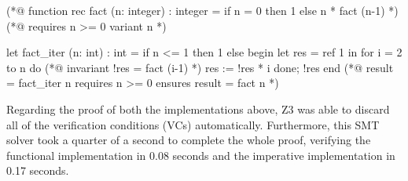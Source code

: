 \bigskip
\newcommand{\provername}[1]{\cellcolor{yellow!25}
\begin{sideways}\textbf{#1}~~\end{sideways}}
\newcommand{\explanation}[1]{\cellcolor{yellow!13}lemma \texttt{#1}}
\newcommand{\transformation}[1]{\cellcolor{yellow!13}transformation \texttt{#1}}
\newcommand{\subgoal}[2]{\cellcolor{yellow!13}subgoal #2}
\newcommand{\valid}[1]{\cellcolor{green!13}#1}
\newcommand{\unknown}[1]{\cellcolor{red!20}#1}
\newcommand{\invalid}[1]{\cellcolor{red!50}#1}
\newcommand{\timeout}[1]{\cellcolor{red!20}(#1)}
\newcommand{\outofmemory}[1]{\cellcolor{red!20}(#1)}
\newcommand{\noresult}{\multicolumn{1}{>{\columncolor[gray]{0.8}}c|}{~}}
\newcommand{\highfailure}{\cellcolor{red!50}FAILURE}
    
\begin{minipage}{\linewidth}
\begin{gospel}
  (*@ function rec fact (n: integer) : integer =
  if n = 0 then 1 else n * fact (n-1) *)
  (*@ requires n >= 0 
    variant n *)
\end{gospel}
\end{minipage}

\begin{minipage}{\linewidth}
\begin{ocamlenv}
  let fact_iter (n: int) : int =
    if n <= 1 then 1
    else
      begin 
        let res = ref 1 in
        for i = 2 to n do
          (*@ invariant !res = fact (i-1) *)
          res := !res * i
        done;
        !res
      end
  (*@ result = fact_iter n
    requires n >= 0 
    ensures result = fact n *)
\end{ocamlenv}
\end{minipage}

Regarding the proof of both the implementations above, Z3 was able to discard all of the verification conditions (VCs) automatically.
Furthermore, this SMT solver took a quarter of a second to complete the whole proof, verifying the functional implementation in 0.08 seconds and the imperative implementation in 0.17 seconds.

